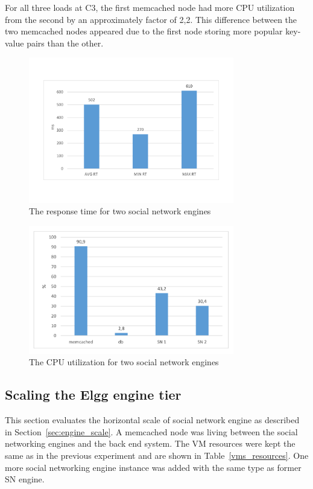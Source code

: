 For all three loads at C3, the first memcached node had more CPU utilization from the second by an approximately factor of 2,2. This difference between the two memcached nodes appeared due to the first node storing more popular key-value pairs than the other.

\begin{figure}[h]
	\centering
	\includegraphics[width=0.8\textwidth,natwidth=200,natheight=150]{./fig/RT2SN.pdf}
	\caption{The response time for two social network engines}
	\label{fig:rt2SN}
\end{figure}

\begin{figure}[h]
	\centering
	\includegraphics[width=0.8\textwidth,natwidth=200,natheight=150]{./fig/Usage2SN.pdf}
	\caption{The CPU utilization for two social network engines}
	\label{fig:cpu2SNavg}
\end{figure}

\subsection{Scaling the Elgg engine tier}

This section evaluates the horizontal scale of social network engine as described in Section~\ref{sec:engine_scale}. A memcached node was living between the social networking engines and the back end system. The VM resources were kept the same as in the previous experiment and are shown in Table~\ref{vms_resources}. One more social networking engine instance was added with the same type as former SN engine. 

